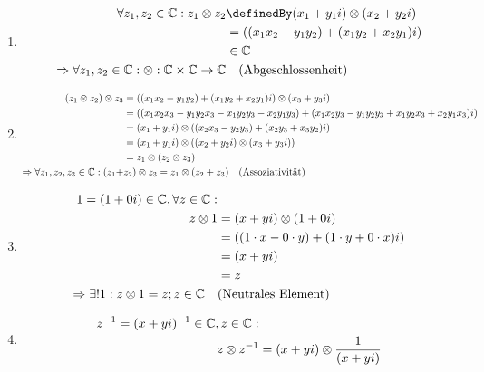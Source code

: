 \documentclass[main.tex]{subfiles}
\begin{document}
\begin{Beweis}
		\begin{enumerate}[1)]
			\item \begin{align*}
						\forall z_1, z_2 \in \C: z_1 \otimes z_2 &\definedBy (x_1 + y_1i) \otimes (x_2 + y_2i) \\
														   		 &= ((x_1x_2 - y_1y_2) + (x_1y_2 + x_2y_1)i) \\
														   		 &\in \C \\
						\Rightarrow \forall z_1, z_2 \in \C: \otimes : \C \times \C \rightarrow \C & \quad \text{(Abgeschlossenheit)}
				  \end{align*}
			\item \begin{align*}
				  		(z_1 \otimes z_2) \otimes z_3 &= ((x_1x_2 - y_1y_2) + (x_1y_2 + x_2y_1)i) \otimes (x_3 + y_3i) \\
										  			  &= ((x_1x_2x_3 - y_1y_2x_3 - x_1y_2y_3 - x_2y_1y_3) + (x_1x_2y_3 - y_1y_2y_3 + x_1y_2x_3 + x_2y_1x_3)i) \\
												      &= (x_1 + y_1i) \otimes ((x_2x_3 - y_2y_3) + (x_2y_3 + x_3y_2)i) \\
												      &= (x_1 + y_1i) \otimes ((x_2 + y_2i) \otimes (x_3 + y_3i)) \\
												      &= z_1 \otimes (z_2 \otimes z_3) \\
						\Rightarrow \forall z_1, z_2, z_3 \in \mathbb{C}: (z_1 + &z_2) \otimes  z_3 = z_1 \otimes (z_2 + z_3) \quad \text{(Assoziativität)}
				  \end{align*}
			\item \begin{align*}
						1 = (1 + 0i) \in \mathbb{C}, \forall z \in \mathbb{C}:& \\
												   z \otimes 1 &= (x + yi) \otimes (1 + 0i) \\
													  		   &= ((1 \cdot x - 0 \cdot y) + (1 \cdot y + 0 \cdot x)i) \\
															   &= (x + yi) \\
															   &= z \\
						\Rightarrow \exists! 1: z \otimes 1 = z; z \in \mathbb{C} \quad &\text{(Neutrales Element)}
				  \end{align*}
			\item \begin{align*}
	  					z^{-1} = (x + yi)^{-1} \in \C, z \in \C:& \\
								  z \otimes z^{-1} &= (x + yi) \otimes \dfrac{1}{(x + yi)} \\

\end{align*}
\end{enumerate}
\end{Beweis}
\end{document}
